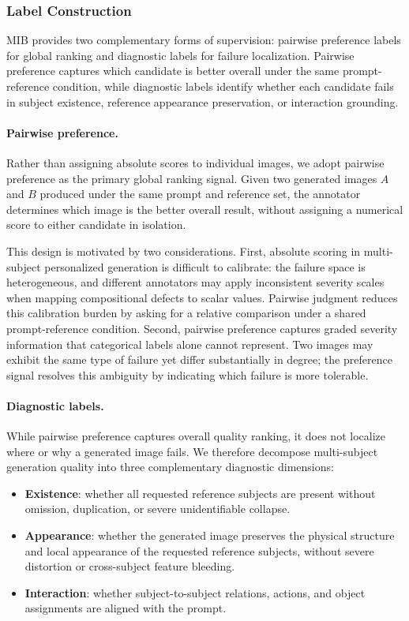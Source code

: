 \subsubsection{Label Construction}

MIB provides two complementary forms of supervision: pairwise preference labels for global ranking and diagnostic labels for failure localization. Pairwise preference captures which candidate is better overall under the same prompt-reference condition, while diagnostic labels identify whether each candidate fails in subject existence, reference appearance preservation, or interaction grounding.

\paragraph{Pairwise preference.}
Rather than assigning absolute scores to individual images, we adopt pairwise preference as the primary global ranking signal. Given two generated images $A$ and $B$ produced under the same prompt and reference set, the annotator determines which image is the better overall result, without assigning a numerical score to either candidate in isolation.

This design is motivated by two considerations. First, absolute scoring in multi-subject personalized generation is difficult to calibrate: the failure space is heterogeneous, and different annotators may apply inconsistent severity scales when mapping compositional defects to scalar values. Pairwise judgment reduces this calibration burden by asking for a relative comparison under a shared prompt-reference condition. Second, pairwise preference captures graded severity information that categorical labels alone cannot represent. Two images may exhibit the same type of failure yet differ substantially in degree; the preference signal resolves this ambiguity by indicating which failure is more tolerable.

\paragraph{Diagnostic labels.}
While pairwise preference captures overall quality ranking, it does not localize where or why a generated image fails. We therefore decompose multi-subject generation quality into three complementary diagnostic dimensions:
\begin{itemize}
    \item \textbf{Existence}: whether all requested reference subjects are present without omission, duplication, or severe unidentifiable collapse.
    \item \textbf{Appearance}: whether the generated image preserves the physical structure and local appearance of the requested reference subjects, without severe distortion or cross-subject feature bleeding.
    \item \textbf{Interaction}: whether subject-to-subject relations, actions, and object assignments are aligned with the prompt.
\end{itemize}

